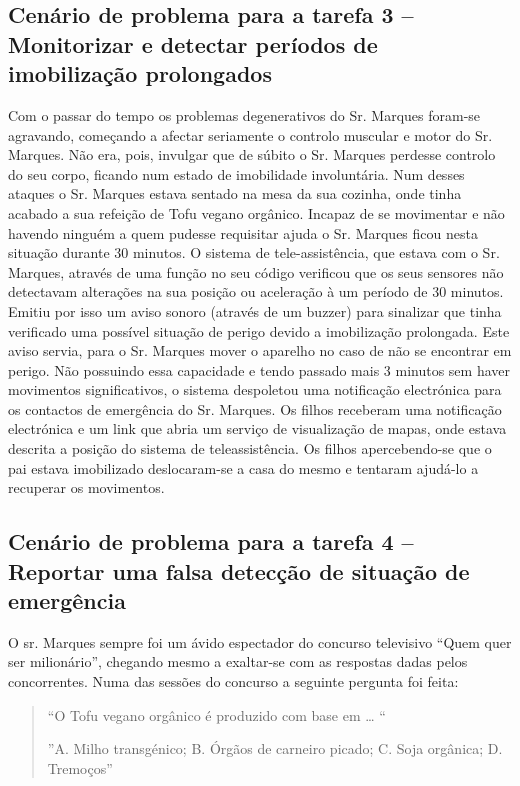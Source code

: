 \subsection{Cenário de problema para a tarefa 3 – Monitorizar e detectar períodos de imobilização prolongados}

Com o passar do tempo os problemas degenerativos do Sr. Marques foram-se agravando, começando a afectar seriamente o controlo muscular e motor do Sr. Marques. Não era, pois, invulgar que de súbito o Sr. Marques perdesse controlo do seu corpo, ficando num estado de imobilidade involuntária.
Num desses ataques o Sr. Marques estava sentado na mesa da sua cozinha, onde tinha acabado a sua refeição de Tofu vegano orgânico. Incapaz de se movimentar e não havendo ninguém a quem pudesse requisitar ajuda o Sr. Marques ficou nesta situação durante 30 minutos. O sistema de tele-assistência, que estava com o Sr. Marques, através de uma função no seu código verificou que os seus sensores não detectavam alterações na sua posição ou aceleração à um período de 30 minutos. Emitiu por isso um aviso sonoro (através de um buzzer) para sinalizar que tinha verificado uma possível situação de perigo devido a imobilização prolongada. Este aviso servia, para o Sr. Marques mover o aparelho no caso de não se encontrar em perigo. Não possuindo essa capacidade e tendo passado mais 3 minutos sem haver movimentos significativos, o sistema despoletou uma notificação electrónica para os contactos de emergência do Sr. Marques. Os filhos receberam uma notificação electrónica e um link que abria um serviço de visualização de mapas, onde estava descrita a posição do sistema de teleassistência.
Os filhos apercebendo-se que o pai estava imobilizado deslocaram-se a casa do mesmo e tentaram ajudá-lo a recuperar os movimentos.


\subsection{Cenário de problema para a tarefa 4 – Reportar uma falsa detecção de situação de emergência}

O sr. Marques sempre foi um ávido espectador do concurso televisivo “Quem quer ser milionário”, chegando mesmo a exaltar-se com as respostas dadas pelos concorrentes. Numa das sessões do concurso a seguinte pergunta foi feita:

\begin{quote}
	“O Tofu vegano orgânico é produzido com base em … “
	
	”A. Milho transgénico;	B. Órgãos de carneiro picado; C. Soja orgânica; D. Tremoços”
\end{quote}

